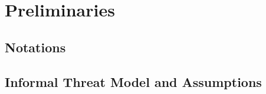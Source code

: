 




\vspace{-1mm}

\section{Preliminaries} \label{preliminaries}



\subsection{Notations}





\vspace{-1mm}

\subsection{Informal Threat Model and Assumptions}\label{Notations-and-Assumptions}

